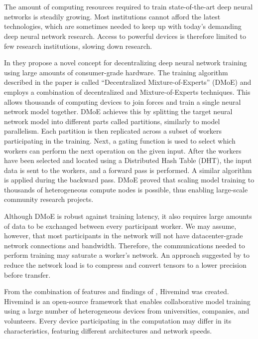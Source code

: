 \chapter{\abstractname}

The amount of computing resources required to train state-of-the-art deep neural networks is steadily growing.
Most institutions cannot afford the latest technologies, which are sometimes needed to keep up with today's demanding deep neural network research.
Access to powerful devices is therefore limited to few research institutions, slowing down research.

In \cite{ryabinin2020learning} they propose a novel concept for decentralizing deep neural network training using large amounts of consumer-grade hardware.
The training algorithm described in the paper is called ``Decentralized Mixture-of-Experts'' (DMoE) and employs a combination of decentralized and Mixture-of-Experts \cite{shazeer2017outrageously} techniques.
This allows thousands of computing devices to join forces and train a single neural network model together.
DMoE achieves this by splitting the target neural network model into different parts called partitions, similarly to model parallelism.
Each partition is then replicated across a subset of workers participating in the training.
Next, a gating function is used to select which workers can perform the next operation on the given input.
After the workers have been selected and located using a Distributed Hash Table (DHT), the input data is sent to the workers, and a forward pass is performed.
A similar algorithm is applied during the backward pass.
DMoE proved that scaling model training to thousands of heterogeneous compute nodes is possible, thus enabling large-scale community research projects.

Although DMoE is robust against training latency, it also requires large amounts of data to be exchanged between every participant worker.
We may assume, however, that most participants in the network will not have datacenter-grade network connections and bandwidth.
Therefore, the communications needed to perform training may saturate a worker's network.
An approach suggested by \cite{ryabinin2020learning} to reduce the network load is to compress and convert tensors to a lower precision before transfer.

From the combination of features and findings of \cite{ryabinin2020learning,ryabinin2021mosphit}, Hivemind was created.
Hivemind \cite{hivemind} is an open-source framework that enables collaborative model training using a large number of heterogeneous devices from universities, companies, and volunteers.
Every device participating in the computation may differ in its characteristics, featuring different architectures and network speeds.

